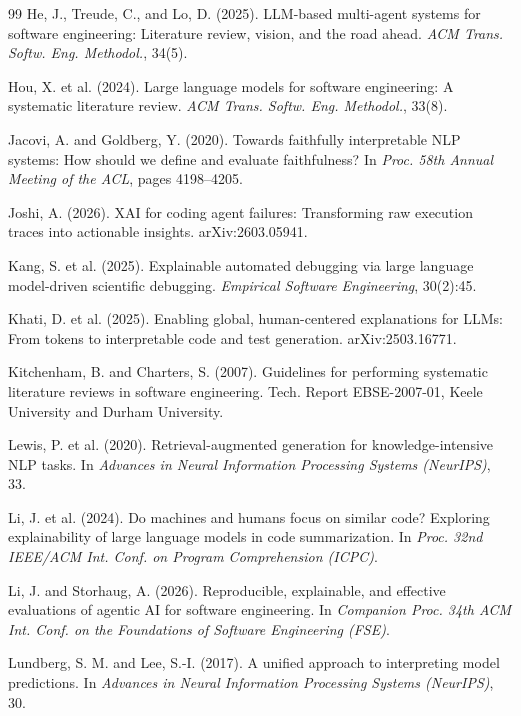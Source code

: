 \documentclass[12pt]{article}
\begin{document}
\begin{thebibliography}{99}
He, J., Treude, C., and Lo, D. (2025). LLM-based multi-agent systems for software
engineering: Literature review, vision, and the road ahead. \textit{ACM Trans.
Softw. Eng. Methodol.}, 34(5).

Hou, X. et al. (2024). Large language models for software engineering: A
systematic literature review. \textit{ACM Trans. Softw. Eng. Methodol.}, 33(8).

Jacovi, A. and Goldberg, Y. (2020). Towards faithfully interpretable NLP systems:
How should we define and evaluate faithfulness? In \textit{Proc. 58th Annual
Meeting of the ACL}, pages 4198--4205.

Joshi, A. (2026). XAI for coding agent failures: Transforming raw execution
traces into actionable insights. arXiv:2603.05941.

Kang, S. et al. (2025). Explainable automated debugging via large language
model-driven scientific debugging. \textit{Empirical Software Engineering},
30(2):45.

Khati, D. et al. (2025). Enabling global, human-centered explanations for LLMs:
From tokens to interpretable code and test generation. arXiv:2503.16771.

Kitchenham, B. and Charters, S. (2007). Guidelines for performing systematic
literature reviews in software engineering. Tech. Report EBSE-2007-01, Keele
University and Durham University.

Lewis, P. et al. (2020). Retrieval-augmented generation for knowledge-intensive
NLP tasks. In \textit{Advances in Neural Information Processing Systems
(NeurIPS)}, 33.

Li, J. et al. (2024). Do machines and humans focus on similar code? Exploring
explainability of large language models in code summarization. In \textit{Proc.
32nd IEEE/ACM Int. Conf. on Program Comprehension (ICPC)}.

Li, J. and Storhaug, A. (2026). Reproducible, explainable, and effective
evaluations of agentic AI for software engineering. In \textit{Companion Proc.
34th ACM Int. Conf. on the Foundations of Software Engineering (FSE)}.

Lundberg, S. M. and Lee, S.-I. (2017). A unified approach to interpreting model
predictions. In \textit{Advances in Neural Information Processing Systems
(NeurIPS)}, 30.


\end{thebibliography}
\end{document}
